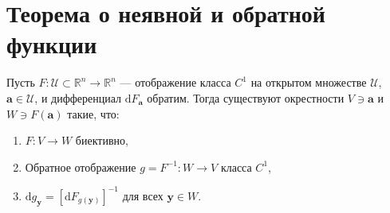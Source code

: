 \section{Теорема о неявной и обратной функции}


\begin{theorem}
Пусть $F: \mathscr{U} \subset \mathbb{R}^n \to \mathbb{R}^n$ --- отображение класса $C^1$ на открытом множестве $\mathscr{U}$, $\mathbf{a} \in \mathscr{U}$, и дифференциал $\mathrm{d}F_{\mathbf{a}}$ обратим. Тогда существуют окрестности $V \ni \mathbf{a}$ и $W \ni F(\mathbf{a})$ такие, что:
\begin{enumerate}
    \item $F: V \to W$ биективно,
    \item Обратное отображение $g = F^{-1}: W \to V$ класса $C^1$,
    \item $\mathrm{d}g_{\mathbf{y}} = [\mathrm{d}F_{g(\mathbf{y})}]^{-1}$ для всех $\mathbf{y} \in W$.
\end{enumerate}
\end{theorem}

